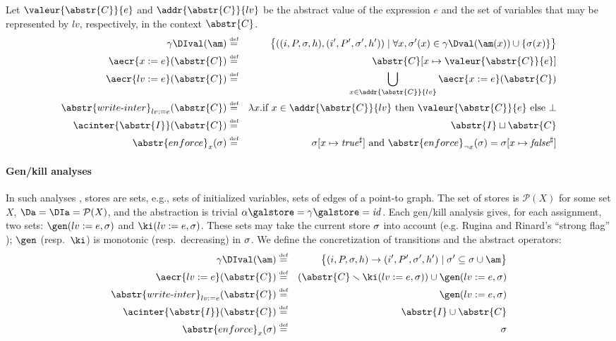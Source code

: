 \documentclass[12pt]{article}
\let\firstunion\cup
\let\savesqcup\sqcup
\let\cup\firstunion
\let\sqcup\savesqcup
\renewcommand{\subset}{\subseteq}
\newcommand{\egdef}{\stackrel{\text{\tiny def}}{=}}
\newcommand{\vrai}{\mathit{true}}
\newcommand{\faux}{\mathit{false}}
\newcommand{\aecra}[2]{\aecr{#1}(#2)}
\newcommand{\iaecr}[1]{\abstr{write\text{-}inter}_{#1}}
\newcommand{\iaecra}[2]{\iaecr{#1}(#2)}
\newcommand{\force}{\abstr{enforce}}
\newcommand{\fleche}{\mapsto}
\newcommand{\func}[2]{\lambda #1. #2 } \newcommand{\fx}[3]{#1[#2 \fleche #3]} \newcommand{\nf}[3]{#1\smallsetminus[#2 \fleche #3]}  \newcommand{\ndf}[2]{#1(#2)\uparrow}
\begin{document}
Let \(\valeur{\abstr{C}}{e}\) and \(\addr{\abstr{C}}{lv}\) be the abstract value of the expression \(e\) and the set of variables that may be represented by \(lv\), respectively, in the context \(\abstr{C}\). 
 \begin{eqnarray*}
 \gamma\DIval(\am) &\egdef& 
\big\{((i,P,\m,h),(i',P',\m',h'))\mid \forall x, \m'(x) \in \gamma\Dval(\am (x))\cup\{\sigma(x)\}\big\}
\\
\aecra{x:=e}{\abstr{C}}&\egdef&\fx{\abstr{C}}{x}{\valeur{\abstr{C}}{e}}\\
\aecra{lv:=e}{\abstr{C}}&\egdef& \bigcup_{x\in \addr{\abstr{C}}{lv} } \aecra{x:=e}{\abstr{C}}\\
  \iaecra{lv:=e}{\abstr{C}} &\egdef&\func{x}{ \text{if } x\in\addr{\abstr{C}}{lv} \text{ then } \valeur{\abstr{C}}{e}\text{ else }\bot }\\
  \acinter{\abstr{I}}(\abstr{C})&\egdef&\abstr{I}\sqcup\abstr{C}\\
  \force_{x}(\m)&\egdef&\fx{\m}{x}{\vrai^{\sharp}}\text{ and } \force_{\neg x}(\m)=\fx{\m}{x}{\faux^{\sharp}}
 \end{eqnarray*}

\paragraph{Gen/kill analyses} In such analyses \cite{DBLP:conf/concur/LammichM07}, stores are sets, e.g., sets of initialized variables, sets of edges of a point-to graph. The set of stores is \(\mathcal{P}(X)\) for some set \(X\), \(\Da=\DIa=\mathcal{P}(X)\), and the abstraction is trivial \(\alpha\galstore=\gamma\galstore=\mathit{id}\). Each gen/kill analysis gives, for each assignment, two sets: \(\gen(lv:=e,\m)\) and \(\ki(lv:=e,\m)\). These sets may take the current store \(\sigma\) into account (e.g. Rugina and Rinard's ``strong flag'' \citerinard); \(\gen\) (resp.\ \(\ki\)) is monotonic (resp.\ decreasing) in \(\sigma\). We define the concretization of transitions and the abstract operators:\\
\begin{eqnarray*}
 \gamma\DIval(\am) &\egdef& 
\big\{(i,P,\m,h)\rightarrow(i',P',\m',h')\mid  \m' \subset \m\cup\am  \big\}\\
\aecra{lv:=e}{\abstr{C}}&\egdef&(\abstr{C}\smallsetminus \ki(lv:=e,\m)) \cup \gen(lv:=e,\m)  \\
\iaecra{lv:=e}{\abstr{C}}&\egdef& \gen(lv:=e,\m) \\
\acinter{\abstr{I}}(\abstr{C})&\egdef&\abstr{I}\cup\abstr{C}\\
\force_{x}(\m)&\egdef&\m
\end{eqnarray*}
\end{document}
